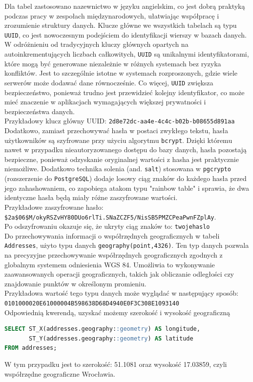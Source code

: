 Dla tabel zastosowano nazewnictwo w języku angielskim, co jest dobrą praktyką podczas pracy w zespołach międzynarodowych, ułatwiając współpracę i zrozumienie struktury danych. Klucze główne we wszystkich tabelach są typu \texttt{UUID}, co jest nowoczesnym podejściem do identyfikacji wierszy w bazach danych. W odróżnieniu od tradycyjnych kluczy głównych opartych na autoinkrementujących liczbach całkowitych, \texttt{UUID} są unikalnymi identyfikatorami, które mogą być generowane niezależnie w różnych systemach bez ryzyka konfliktów. Jest to szczególnie istotne w systemach rozproszonych, gdzie wiele serwerów może dodawać dane równocześnie. Co więcej, \texttt{UUID} zwiększa bezpieczeństwo, ponieważ trudno jest przewidzieć kolejny identyfikator, co może mieć znaczenie w aplikacjach wymagających większej prywatności i bezpieczeństwa danych. \\
Przykładowy klucz główny UUID: \texttt{2d8e72dc-aa4e-4c4c-b02b-b08655d891aa} \\

Dodatkowo, zamiast przechowywać hasła w postaci zwykłego tekstu, hasła użytkowników są szyfrowane przy użyciu algorytmu \texttt{bcrypt}. Dzięki któremu nawet w przypadku nieautoryzowanego dostępu do bazy danych, hasła pozostają bezpieczne, ponieważ odzyskanie oryginalnej wartości z hasha jest praktycznie niemożliwe. Dodatkowo technika solenia (and. \texttt{salt}) stosowana w \texttt{pgcrypto} (rozszerzenie do \texttt{PostgreSQL}) dodaje losowy ciąg znaków do każdego hasła przed jego zahashowaniem, co zapobiega atakom typu "rainbow table" i sprawia, że dwa identyczne hasła będą miały różne zaszyfrowane wartości. \\
Przykładowe zaszyfrowane hasło: \\
\texttt{\$2a\$06\$M/okyRSZvHY80DUo6rlTi.SNaZCZF5/NisSB5PMZCPeaPwnFZplAy}. \\
Po odszyfrowaniu okazuje się, że ukryty ciąg znaków to: \texttt{twojehaslo} \\

Do przechowywania informacji o współrzędnych geograficznych w tabeli \texttt{Addresses}, użyto typu danych \texttt{geography(point,4326)}. Ten typ danych pozwala na precyzyjne przechowywanie współrzędnych geograficznych zgodnych z globalnym systemem odniesienia WGS 84. Umożliwia to wykonywanie zaawansowanych operacji geograficznych, takich jak obliczanie odległości czy znajdowanie punktów w określonym promieniu. \\
Przykładowa wartość tego typu danych może wyglądać w następujący sposób: \\
\texttt{0101000020E61000004B598638D68D4940E0F3C308E1093140} \\
Odpowiednią kwerendą, uzyskać możemy szerokość i wysokość geograficzną \\
{\belowcaptionskip=-9pt
\begin{lstlisting}[language=SQL,caption=Przykład kwerendy SQL, label=lst:sql_query]
SELECT ST_X(addresses.geography::geometry) AS longitude, 
       ST_Y(addresses.geography::geometry) AS latitude 
FROM addresses;
\end{lstlisting}
}
W tym przypadku jest to szerokość: 51.1081 oraz wysokość 17.03859, czyli współrzędne geograficzne Wrocławia.